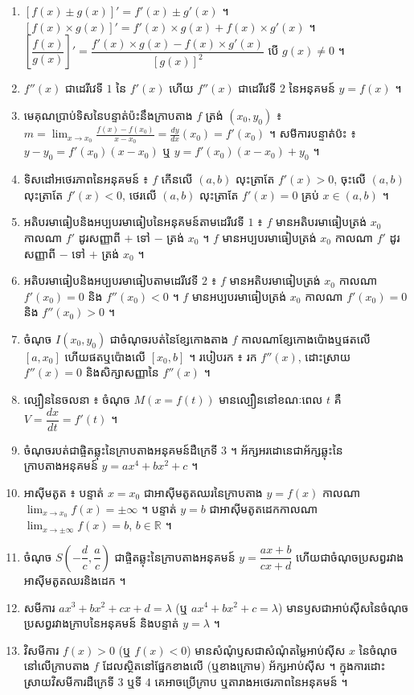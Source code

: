 \begin{note}[មេរៀនសង្ខេប]
\begin{enumerate}[1]
  \item $[f(x) \pm g(x)]' = f'(x) \pm g'(x)$ ។ $[f(x)\times g(x)]' = f'(x)\times g(x) + f(x)\times g'(x)$ ។ $\left[\dfrac{f(x)}{g(x)}\right]' = \dfrac{f'(x)\times g(x) - f(x)\times g'(x)}{[g(x)]^2}$ បើ $g(x) \ne 0$ ។
  \item $f''(x)$ ជាដេរីវេទី $1$ នៃ $f'(x)$ ហើយ $f''(x)$ ជាដេរីវេទី $2$ នៃអនុគមន៍ $y = f(x)$ ។
  \item មេគុណប្រាប់ទិសនៃបន្ទាត់ប៉ះនឹងក្រាបតាង $f$ ត្រង់ $(x_0, y_0)$ ៖ $m = \displaystyle\lim_{x \to x_0}\frac{f(x) - f(x_0)}{x - x_0} = \frac{dy}{dx}(x_0) = f'(x_0)$ ។ សមីការបន្ទាត់ប៉ះ ៖ $y - y_0 = f'(x_0)(x - x_0)$ ឬ $y = f'(x_0)(x - x_0) + y_0$ ។
  \item ទិសដៅអថេរភាពនៃអនុគមន៍ ៖ $f$ កើនលើ $(a, b)$ លុះត្រាតែ $f'(x) > 0$, ចុះលើ $(a, b)$ លុះត្រាតែ $f'(x) < 0$, ថេរលើ $(a, b)$ លុះត្រាតែ $f'(x) = 0$ គ្រប់ $x \in (a, b)$ ។
  \item អតិបរមាធៀបនិងអប្បបរមាធៀបនៃអនុគមន៍តាមដេរីវេទី $1$ ៖ $f$ មានអតិបរមាធៀបត្រង់ $x_0$ កាលណា $f'$ ដូរសញ្ញាពី $+$ ទៅ $-$ ត្រង់ $x_0$ ។ $f$ មានអប្បបរមាធៀបត្រង់ $x_0$ កាលណា $f'$ ដូរសញ្ញាពី $-$ ទៅ $+$ ត្រង់ $x_0$ ។
  \item អតិបរមាធៀបនិងអប្បបរមាធៀបតាមដេរីវេទី $2$ ៖ $f$ មានអតិបរមាធៀបត្រង់ $x_0$ កាលណា $f'(x_0) = 0$ និង $f''(x_0) < 0$ ។ $f$ មានអប្បបរមាធៀបត្រង់ $x_0$ កាលណា $f'(x_0) = 0$ និង $f''(x_0) > 0$ ។
  \item ចំណុច $I(x_0, y_0)$ ជាចំណុចរបត់នៃខ្សែកោងតាង $f$ កាលណាខ្សែកោងប៉ោងឬផតលើ $[a, x_0]$ ហើយផតឬប៉ោងលើ $[x_0, b]$ ។ របៀបរក ៖ រក $f''(x)$, ដោះស្រាយ $f''(x) = 0$ និងសិក្សាសញ្ញានៃ $f''(x)$ ។
  \item ល្បឿននៃចលនា ៖ ចំណុច $M(x = f(t))$ មានល្បឿននៅខណៈពេល $t$ គឺ $V = \dfrac{dx}{dt} = f'(t)$ ។
  \item ចំណុចរបត់ជាផ្ចិតឆ្លុះនៃក្រាបតាងអនុគមន៍ដឺក្រេទី $3$ ។ អ័ក្សអរដោនេជាអ័ក្សឆ្លុះនៃក្រាបតាងអនុគមន៍ $y = ax^4 + bx^2 + c$ ។
  \item អាស៊ីមតូត ៖ បន្ទាត់ $x = x_0$ ជាអាស៊ីមតូតឈរនៃក្រាបតាង $y = f(x)$ កាលណា $\displaystyle\lim_{x \to x_0} f(x) = \pm\infty$ ។ បន្ទាត់ $y = b$ ជាអាស៊ីមតូតដេកកាលណា $\displaystyle\lim_{x \to \pm\infty} f(x) = b$, $b \in \mathbb{R}$ ។
  \item ចំណុច $S\left(-\dfrac{d}{c}, \dfrac{a}{c}\right)$ ជាផ្ចិតឆ្លុះនៃក្រាបតាងអនុគមន៍ $y = \dfrac{ax + b}{cx + d}$ ហើយជាចំណុចប្រសព្វរវាងអាស៊ីមតូតឈរនិងដេក ។
  \item សមីការ $ax^3 + bx^2 + cx + d = \lambda$ (ឬ $ax^4 + bx^2 + c = \lambda$) មានឫសជាអាប់ស៊ីសនៃចំណុចប្រសព្វរវាងក្រាបនៃអនុគមន៍ និងបន្ទាត់ $y = \lambda$ ។
  \item វិសមីការ $f(x) > 0$ (ឬ $f(x) < 0$) មានសំណុំឫសជាសំណុំតម្លៃអាប់ស៊ីស $x$ នៃចំណុចនៅលើក្រាបតាង $f$ ដែលស្ថិតនៅផ្នែកខាងលើ (ឬខាងក្រោម) អ័ក្សអាប់ស៊ីស ។ ក្នុងការដោះស្រាយវិសមីការដឺក្រេទី $3$ ឬទី $4$ គេអាចប្រើក្រាប ឬតារាងអថេរភាពនៃអនុគមន៍ ។
\end{enumerate}
\end{note}

